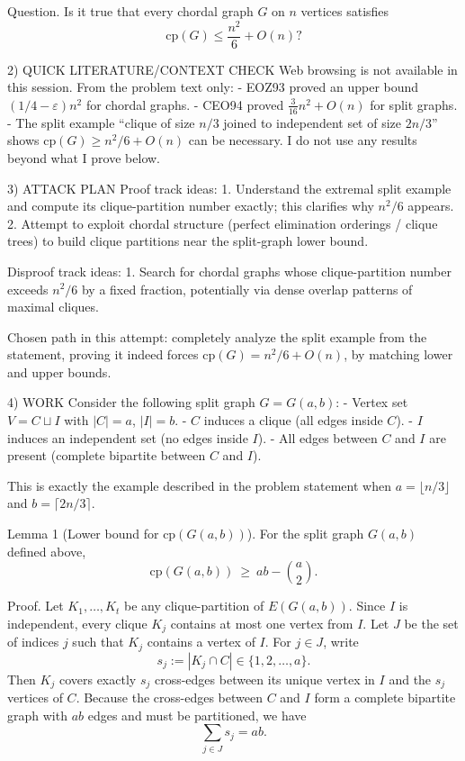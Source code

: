 Question.
Is it true that every chordal graph $G$ on $n$ vertices satisfies
\[\mathrm{cp}(G)\le \frac{n^2}{6}+O(n)?\]

2) QUICK LITERATURE/CONTEXT CHECK
Web browsing is not available in this session.
From the problem text only:
- EOZ93 proved an upper bound $(1/4-\varepsilon)n^2$ for chordal graphs.
- CEO94 proved $\frac{3}{16}n^2+O(n)$ for split graphs.
- The split example ``clique of size $n/3$ joined to independent set of size $2n/3$'' shows $\mathrm{cp}(G)\ge n^2/6+O(n)$ can be necessary.
I do not use any results beyond what I prove below.

3) ATTACK PLAN
Proof track ideas:
1. Understand the extremal split example and compute its clique-partition number exactly; this clarifies why $n^2/6$ appears.
2. Attempt to exploit chordal structure (perfect elimination orderings / clique trees) to build clique partitions near the split-graph lower bound.

Disproof track ideas:
1. Search for chordal graphs whose clique-partition number exceeds $n^2/6$ by a fixed fraction, potentially via dense overlap patterns of maximal cliques.

Chosen path in this attempt: completely analyze the split example from the statement, proving it indeed forces $\mathrm{cp}(G)=n^2/6+O(n)$, by matching lower and upper bounds.

4) WORK
Consider the following split graph $G=G(a,b)$:
- Vertex set $V=C\sqcup I$ with $|C|=a$, $|I|=b$.
- $C$ induces a clique (all edges inside $C$).
- $I$ induces an independent set (no edges inside $I$).
- All edges between $C$ and $I$ are present (complete bipartite between $C$ and $I$).

This is exactly the example described in the problem statement when $a=\lfloor n/3\rfloor$ and $b=\lceil 2n/3\rceil$.

Lemma 1 (Lower bound for $\mathrm{cp}(G(a,b))$).
For the split graph $G(a,b)$ defined above,
\[\mathrm{cp}(G(a,b))\ \ge\ ab-\binom{a}{2}.\]

Proof.
Let $K_1,\dots,K_t$ be any clique-partition of $E(G(a,b))$.
Since $I$ is independent, every clique $K_j$ contains at most one vertex from $I$.
Let $J$ be the set of indices $j$ such that $K_j$ contains a vertex of $I$.
For $j\in J$, write
\[s_j:=|K_j\cap C|\in\{1,2,\dots,a\}.\]
Then $K_j$ covers exactly $s_j$ cross-edges between its unique vertex in $I$ and the $s_j$ vertices of $C$.
Because the cross-edges between $C$ and $I$ form a complete bipartite graph with $ab$ edges and must be partitioned,
we have
\[\sum_{j\in J} s_j = ab.\tag{1}\]

